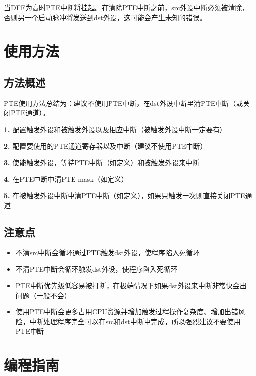 \documentclass[
  12pt,
]{book}
\begin{document}
当DFF为高时PTE中断将挂起。在清除PTE中断之前，src外设中断必须被清除，否则另一个启动脉冲将发送到dst外设，这可能会产生未知的错误。

\hypertarget{ux4f7fux7528ux65b9ux6cd5-2}{%
\section{使用方法}\label{ux4f7fux7528ux65b9ux6cd5-2}}

\hypertarget{ux65b9ux6cd5ux6982ux8ff0-2}{%
\subsection{方法概述}\label{ux65b9ux6cd5ux6982ux8ff0-2}}

PTE使用方法总结为：建议不使用PTE中断，在dst外设中断里清PTE中断（或关闭PTE通道）。

\textbf{1.} 配置触发外设和被触发外设以及相应中断（被触发外设中断一定要有）

\textbf{2.} 配置要使用的PTE通道寄存器以及中断（建议不使用PTE中断）

\textbf{3.} 使能触发外设，等待PTE中断（如定义）和被触发外设来中断

\textbf{4.} 在PTE中断中清PTE mask（如定义）

\textbf{5.} 在被触发外设中断中清PTE中断（如定义），如果只触发一次则直接关闭PTE通道

\hypertarget{ux6ce8ux610fux70b9-2}{%
\subsection{注意点}\label{ux6ce8ux610fux70b9-2}}

\begin{itemize}
\item
  不清src中断会循环通过PTE触发dst外设，使程序陷入死循环
\item
  不清PTE中断会循环触发dst外设，使程序陷入死循环
\item
  PTE中断优先级低容易被打断，在极端情况下如果dst外设来中断非常快会出问题（一般不会）
\item
  使用PTE中断会更多占用CPU资源并增加触发过程操作复杂度、增加出错风险，中断处理程序完全可以在src和dst中断中完成，所以强烈建议不要使用PTE中断
\end{itemize}

\hypertarget{ux7f16ux7a0bux6307ux5357-2}{%
\section{编程指南}\label{ux7f16ux7a0bux6307ux5357-2}}
\end{document}
